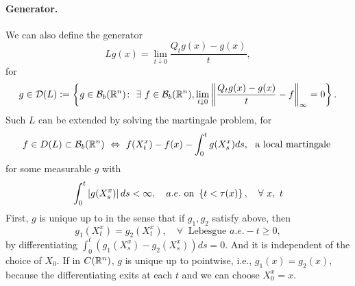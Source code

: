 \paragraph{Generator.} We can also define the generator
\begin{equation*}
    Lg(x) = \lim_{t \downarrow 0} \frac{Q_tg(x) - g(x)}{t},
\end{equation*}
for
\begin{equation*}
    g \in \mathcal{D}(L) \vcentcolon= \left\{g\in \mathcal{B}_b(\mathbb{R}^n) \colon~\exists~f \in \mathcal{B}_b(\mathbb{R}^n), \lim_{t \downarrow 0} \left\lVert\frac{Q_tg(x) - g(x)}{t} - f\right\lVert_\infty = 0\right\}.
\end{equation*}
Such $L$ can be extended by solving the martingale problem, for
\begin{equation*}
    f \in D(L)\subset \mathcal{B}_b(\mathbb{R}^n)~\Leftrightarrow~ f(X^x_t) - f(x) - \int_0^t g(X^x_s)ds,~\text{ a local martingale }
\end{equation*}
for some measurable $g$ with
\begin{equation*}
    \int_0^t \left\lvert g(X^x_s)\right\lvert ds <\infty,\quad a.e. \text{ on }\left\{t < \tau(x)\right\},\quad \forall~x,~t
\end{equation*} 
First, $g$ is unique up to in the sense that if $g_1,g_2$ satisfy above, then
\begin{equation*}
    g_1(X^x_t) = g_2(X^x_t),\quad \forall~ \text{ Lebesgue }a.e. - t \geq 0,
\end{equation*}
by differentiating $\int_0^t(g_1(X^x_s) - g_2(X^x_s))ds = 0$. And it is independent of the choice of $X_0$. If in $C(\mathbb{R}^n)$, $g$ is unique up to pointwise, i.e., $g_1(x) = g_2(x)$, because the differentiating exits at each $t$ and we can choose $X^x_0 = x$.

